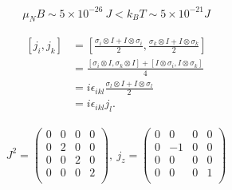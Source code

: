 \begin{ex}
    \label{ex7.24}
    \begin{align*}
        \mu_N B \sim 5 \times 10^{-26} \ J < k_B T \sim 5 \times 10^{-21} J
    \end{align*}
\end{ex}

\begin{ex}
    \label{ex7.25}
    \begin{align*}
        \left[ j_i , j_k \right]
         & =
        \left[
            \frac{ \sigma_i \otimes I + I \otimes \sigma_i}{2},
            \frac{\sigma_k \otimes I + I \otimes \sigma_k}{2}
            \right]                                                        \\
         & =
        \frac{\left[\sigma_i \otimes I,\sigma_k \otimes I \right]
            +
            \left[I\otimes \sigma_i , I\otimes \sigma_k \right]
        }{4}                                                               \\
         & =
        i \epsilon_{ikl} \frac{\sigma_l \otimes I + I \otimes \sigma_l}{2} \\
         & =
        i \epsilon_{ikl}  j_l.
    \end{align*}
\end{ex}

\begin{ex}
    \label{ex7.26}
    \begin{align*}
        J^2 =
        \begin{pmatrix}
            0 & 0 & 0 & 0 \\
            0 & 2 & 0 & 0 \\
            0 & 0 & 2 & 0 \\
            0 & 0 & 0 & 2 \\
        \end{pmatrix},\
        j_z = \begin{pmatrix}
            0 & 0  & 0 & 0 \\
            0 & -1 & 0 & 0 \\
            0 & 0  & 0 & 0 \\
            0 & 0  & 0 & 1 \\
        \end{pmatrix}
    \end{align*}
\end{ex}

\begin{ex}
    \label{ex7.27}
\end{ex}

